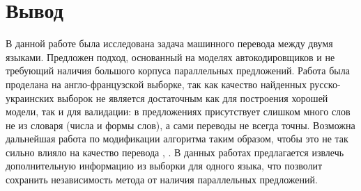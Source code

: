 \documentclass[12pt,twoside]{article}
\begin{document}
\section{Вывод}

В данной работе была исследована задача машинного перевода между двумя языками. Предложен подход, основанный на моделях автокодировщиков и не требующий наличия большого корпуса параллельных предложений. Работа была проделана на англо-французской выборке, так как качество найденных русско-украинских выборок не является достаточным как для построения хорошей модели, так и для валидации: в предложениях присутствует слишком много слов не из словаря (числа и формы слов), а сами переводы не всегда точны. Возможна дальнейшая работа по модификации алгоритма таким образом, чтобы это не так сильно влияло на качество перевода \cite{irvine2016end}, \cite{klementiev2012toward}. В данных работах предлагается извлечь дополнительную информацию из выборки для одного языка, что позволит сохранить независимость метода от наличия параллельных предложений.



\end{document}
